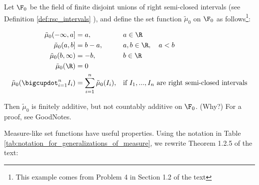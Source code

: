 \documentclass{article} %
\newcommand{\fasf}{\tilde{\mu}_0}
\begin{document}
 \begin{example} Let $\F_0$ be the field of finite disjoint unions of right semi-closed intervals (see Definition \ref{def:rsc_intervals} ), and define the set function $\fasf$ on $\F_0$ as follows\footnote{This example comes from Problem 4 in Section 1.2 of the text}:

\begin{align*}
\fasf(-\infty,a] &=a, && a \in \R  \\
\fasf(a,b] &= b-a, && a,b \in \R, \quad a<b  \\
\fasf(b, \infty) &= -b, && b \in \R \\
\fasf(\R) &=0 &&\\
\fasf(\bigcupdot_{i=1}^n I_i) &= \sum_{i=1}^n \fasf(I_i), && \text{if $I_1, ..., I_n$ are right semi-closed intervals} 
\end{align*}
	
Then $\fasf$ is finitely additive, but not countably additive on $\F_0$.  (Why?) For a proof, see GoodNotes.
 \end{example}

 
Measure-like set functions have useful properties. Using the notation in Table \ref{tab:notation_for_generalizations_of_measure}, we rewrite Theorem 1.2.5 of the text:
 
\end{document}
